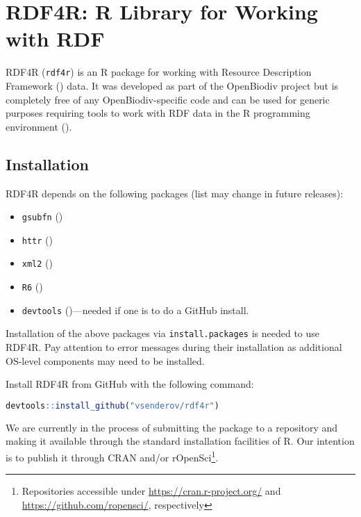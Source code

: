 \chapter{RDF4R: R Library for Working with RDF}
\label{chapter-rdf4r}

RDF4R ({\tt rdf4r}) is an R package for working with Resource Description Framework (\cite{rdf_working_group_resource_2014}) data. It was developed as part of the OpenBiodiv project but is completely free of any OpenBiodiv-specific code and can be used for generic purposes requiring tools to work with RDF data in the R programming environment (\cite{r_core_team_r:_2016}).

\section{Installation}

RDF4R depends on the following packages (list may change in future releases):

\begin{itemize}
\item{{\tt gsubfn} (\cite{grothendieck_gsubfn:_2018})}
\item{{\tt httr} (\cite{wickham_httr:_2017})}
\item{{\tt xml2} (\cite{wickham_xml2:_2018})}
\item{{\tt R6} (\cite{chang_r6:_2017})}
\item{{{\tt devtools} (\cite{wickham_devtools:_2018})}---needed if one is to do a GitHub install.}
\end{itemize}

Installation of the above packages via {\tt install.packages} is needed to use RDF4R. Pay attention to error messages during their installation as additional OS-level components may need to be installed.

Install RDF4R from GitHub with the following command:

\begin{lstlisting}[language=R,
basicstyle=\ttfamily\tiny]
devtools::install_github("vsenderov/rdf4r")
\end{lstlisting}

We are currently in the process of submitting the package to a repository and making it available through the standard installation facilities of R. Our intention is to publish it through CRAN and/or rOpenSci\footnote{Repositories accessible under \url{https://cran.r-project.org/} and \url{https://github.com/ropensci/}, respectively}.

